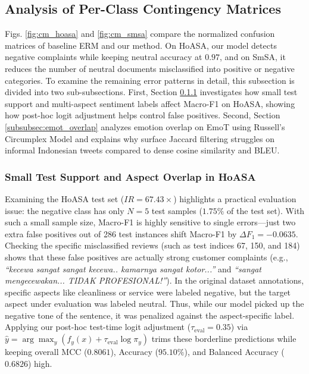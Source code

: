 \documentclass[10pt,journal,compsoc]{IEEEtran}
\begin{document}
\subsection{Analysis of Per-Class Contingency Matrices}
\label{subsec:cm_analysis}

Figs. \ref{fig:cm_hoasa} and \ref{fig:cm_smsa} compare the normalized confusion matrices of baseline ERM and our method. On HoASA, our model detects negative complaints while keeping neutral accuracy at $0.97$, and on SmSA, it reduces the number of neutral documents misclassified into positive or negative categories. To examine the remaining error patterns in detail, this subsection is divided into two sub-subsections. First, Section \ref{subsubsec:hoasa_support} investigates how small test support and multi-aspect sentiment labels affect Macro-F1 on HoASA, showing how post-hoc logit adjustment helps control false positives. Second, Section \ref{subsubsec:emot_overlap} analyzes emotion overlap on EmoT using Russell's Circumplex Model and explains why surface Jaccard filtering struggles on informal Indonesian tweets compared to dense cosine similarity and BLEU.

\subsubsection{Small Test Support and Aspect Overlap in HoASA}
\label{subsubsec:hoasa_support}
Examining the HoASA test set ($IR = 67.43\times$) highlights a practical evaluation issue: the negative class has only $N=5$ test samples ($1.75\%$ of the test set). With such a small sample size, Macro-F1 is highly sensitive to single errors—just two extra false positives out of 286 test instances shift Macro-F1 by $\Delta F_1 = -0.0635$. Checking the specific misclassified reviews (such as test indices 67, 150, and 184) shows that these false positives are actually strong customer complaints (e.g., \textit{``kecewa sangat sangat kecewa.. kamarnya sangat kotor...''} and \textit{``sangat mengecewakan... TIDAK PROFESIONAL!''}). In the original dataset annotations, specific aspects like cleanliness or service were labeled negative, but the target aspect under evaluation was labeled neutral. Thus, while our model picked up the negative tone of the sentence, it was penalized against the aspect-specific label. Applying our post-hoc test-time logit adjustment ($\tau_{\text{eval}} = 0.35$) via $\hat{y} = \arg\max_y (f_y(x) + \tau_{\text{eval}} \log \pi_y)$ trims these borderline predictions while keeping overall MCC ($0.8061$), Accuracy ($95.10\%$), and Balanced Accuracy ($0.6826$) high.
\end{document}
